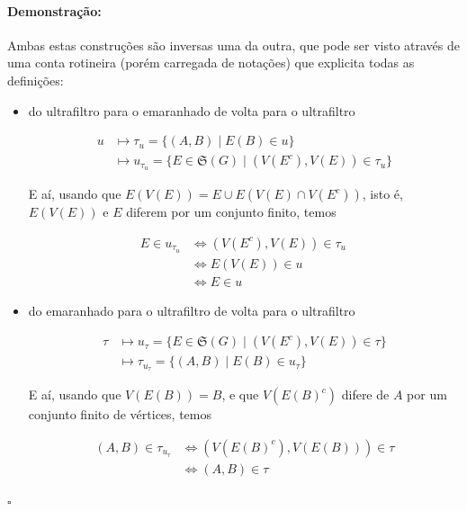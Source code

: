 \documentclass[11pt]{article}
\newcommand{\pulinho}{\vspace{.5cm}}
\theoremstyle{definition}
\theoremstyle{definition}
\theoremstyle{definition}
\theoremstyle{definition}
\theoremstyle{definition}
\theoremstyle{definition}
\theoremstyle{definition}
\theoremstyle{definition}
\theoremstyle{definition}
\theoremstyle{definition}
\theoremstyle{definition}
\theoremstyle{definition}
\newenvironment{prova}{\paragraph{Demonstração:}}{\hfill$\square$ 
\pulinho
}
\begin{document}
\begin{prova}
    Ambas estas construções são inversas uma da outra, que pode ser visto através de uma conta rotineira (porém carregada de notações) que explicita todas as definições:
    \begin{itemize}[]
        \item do ultrafiltro para o emaranhado de volta para o ultrafiltro
        
        \begin{align*}
            u &\mapsto \tau_u = \{(A,B) \mid E(B) \in u\} \\
            &\mapsto  u_{\tau_u} = \{E \in \mathfrak{S}(G) \mid (V(E^c),V(E)) \in \tau_u\}
        \end{align*}  

        E aí, usando que $E(V(E)) = E \cup E(V(E)\cap V(E^c))$, isto é, $E(V(E))$ e $E$ diferem por um conjunto finito, temos

        \begin{align*}
        E \in u_{\tau_u} &\iff (V(E^c),V(E)) \in \tau_u\ \\
        &\iff E(V(E)) \in u \\ 
        &\iff E \in u
         \end{align*}

         \item do emaranhado para o ultrafiltro de volta para o ultrafiltro

            \begin{align*}
            \tau &\mapsto u_\tau = \{E \in \mathfrak{S}(G) \mid (V(E^c),V(E)) \in \tau\} \\ 
            &\mapsto \tau_{u_\tau} = \{(A,B) \mid E(B) \in u_\tau\}
        \end{align*}

        E aí, usando que $V(E(B)) = B$, e que $V(E(B)^c)$ difere de $A$ por um conjunto finito de vértices, temos 

                \begin{align*}
        (A,B) \in \tau_{u_\tau} &\iff (V(E(B)^c),V(E(B)))\in \tau \\
        &\iff (A,B) \in \tau 
         \end{align*}
         
    \end{itemize}
\end{prova}
\end{document}
